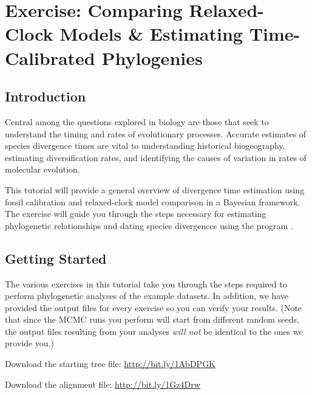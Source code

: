 \section{Exercise: Comparing Relaxed-Clock Models \& Estimating Time-Calibrated Phylogenies}

\subsection{Introduction}

Central among the questions explored in biology are those that seek to understand the timing and rates of evolutionary processes. Accurate estimates of species divergence times are vital to understanding historical biogeography, estimating diversification rates, and identifying the causes of variation in rates of molecular evolution. 

This tutorial will provide a general overview of divergence time estimation using fossil calibration and relaxed-clock model comparison in a Bayesian framework. The exercise will guide you through the steps necessary for estimating phylogenetic relationships and dating species divergences using the program \href{https://github.com/revbayes/revbayes}{\RevBayes}. 

%

\bigskip
\subsection{Getting Started}\label{gettingStarted}


The various exercises in this tutorial take you through the steps required to perform phylogenetic analyses of the example datasets. 
In addition, we have provided the output files for every exercise so you can verify your results. (Note that since the MCMC runs you perform will start from different random seeds, the output files resulting from your analyses \textit{will not} be identical to the ones we provide you.)

\begin{framed}
Download the starting tree file: \href{http://bit.ly/1AbDPGK}{http://bit.ly/1AbDPGK}

Download the alignment file: \href{http://bit.ly/1Gz4Drw}{http://bit.ly/1Gz4Drw}
\end{framed}

